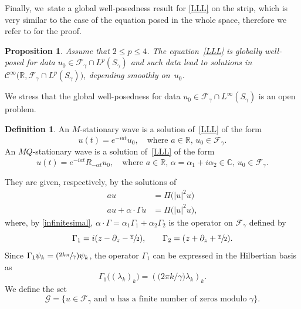 \documentclass[JEP,XML,SOM,Unicode,NoFloatCountersInSection,published]{cedram}
\newcommand{\Psfrac}[2]{(\sfrac{#1}{#2})}
\newtheorem{prop}[theorem]{Proposition}
\theoremstyle{definition}
\newtheorem{df}[theorem]{Definition}
\let\ov\overline
\newcommand\C{\mathbb C}
\newcommand\R{\mathbb R}
\begin{document}
Finally, we~state a global well-posedness result for \eqref{LLL} on the strip, which is very similar to the case of the equation posed in the whole space, therefore we refer to \cite[Prop.\,3.7]{GGT} for the proof.
\begin{prop}
Assume that $2\leq p\leq 4$. The equation~\eqref{LLL} is globally well-posed for data $u_0 \in \mathcal{F}_{\gamma} \cap L^p(S_{\gamma})$ and such data lead to solutions in $\mathcal{C}^\infty \bigl(\R, \mathcal{F}_{\gamma} \cap L^p(S_{\gamma}) \bigr)$, depending smoothly on~$u_0$.
\end{prop}

We stress that the global well-posedness for data $u_0 \in \mathcal{F}_{\gamma} \cap L^{\infty}(S_{\gamma}) $ is an open problem.


\begin{df}
An $M$-stationary wave is a solution of~\eqref{LLL} of the form
\[
u(t) = e^{-i a t} u_0, \quad \text{where $a \in \mathbb{R}$, $u_0 \in \mathcal{F}_{\gamma}$}.
\]
An $MQ$-stationary wave is a solution of~\eqref{LLL} of the form
\[
u(t) = e^{-i a t} R_{-\alpha t}u_0, \quad \text{where $a \in \mathbb{R}$, $\alpha=\alpha_1+i\alpha_2 \in \mathbb{\C}$, $u_0 \in \mathcal{F}_{\gamma}$}.
\]
\end{df}

They are given, respectively, by the solutions of
\begin{align}
\label{M} \tag{$M$}
a u &= \Pi \bigl(|u|^2 u\bigr)
\\
\label{MQ} \tag{$MQ$}
a u + \alpha \cdot \Gamma u &= \Pi \bigl(|u|^2 u\bigr),
\end{align}
where, by \eqref{infinitesimal}, $\alpha \cdot \Gamma =\alpha_1 \Gamma_1+\alpha_2 \Gamma_2 $ is the operator on $\mathcal{F}_\gamma$ defined by
\begin{equation*}
\Gamma_1=i(z -\partial_z-\sfrac{\ov z}2), \qquad \Gamma_2=(z +\partial_z+\sfrac{\ov z}2).
\end{equation*}
Since $\Gamma_1 \psi_k = \Psfrac{2 k \pi}\gamma \psi_k$, the operator $\Gamma_1$ can be expressed in the Hilbertian basis as
\[
\Gamma_1 \bigl((\lambda_k)_k\bigr) = \left(\bigl({2\pi k}/{\gamma} \bigr) \lambda_k\right)_k.
\]
We define the set
\begin{equation*}
\mathcal{G}=\bigl\{u\in \mathcal{F}_\gamma \text{ and } u \text{ has a finite number of zeros modulo $\gamma$} \bigr\}.
\end{equation*}
\end{document}
